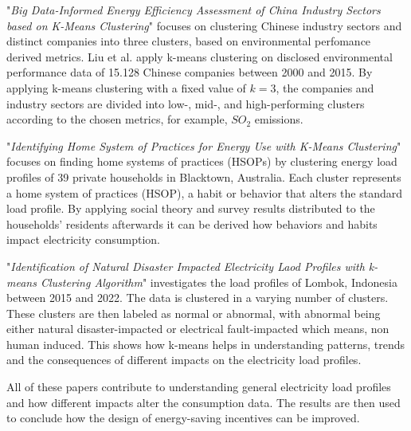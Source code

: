 "\textit{Big Data-Informed Energy Efficiency Assessment of China Industry Sectors based on K-Means Clustering}" \cite{LIU-BDE} focuses on clustering Chinese industry sectors and distinct companies into three clusters, based on environmental perfomance derived metrics.
Liu et al. apply k-means clustering on disclosed environmental performance data of 15.128 Chinese companies between 2000 and 2015.
By applying k-means clustering with a fixed value of $k=3$, the companies and industry sectors are divided into low-, mid-, and high-performing clusters according to the chosen metrics, for example, $SO_2$ emissions.

"\textit{Identifying Home System of Practices for Energy Use with K-Means Clustering}" \cite{MAL-HBP} focuses on finding home systems of practices (HSOPs) by clustering energy load profiles of 39 private households in Blacktown, Australia.
Each cluster represents a home system of practices (HSOP), a habit or behavior that alters the standard load profile.
By applying social theory and survey results distributed to the households' residents afterwards it can be derived how behaviors and habits impact electricity consumption.

"\textit{Identification of Natural Disaster Impacted Electricity Laod Profiles with k-means Clustering Algorithm}" \cite{JES-IND} investigates the load profiles of Lombok, Indonesia between 2015 and 2022.
The data is clustered in a varying number of clusters.
These clusters are then labeled as normal or abnormal, with abnormal being either natural disaster-impacted or electrical fault-impacted which means, non human induced.
This shows how k-means helps in understanding patterns, trends and the consequences of different impacts on the electricity load profiles.

All of these papers contribute to understanding general electricity load profiles and how different impacts alter the consumption data.
The results are then used to conclude how the design of energy-saving incentives can be improved.



